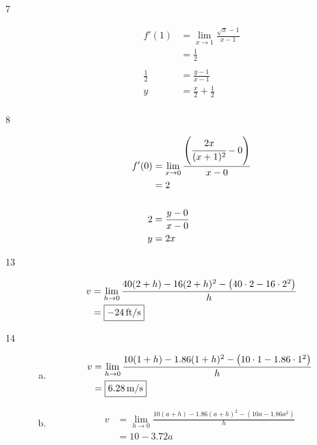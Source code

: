 \documentclass[letterpaper, landscape]{exam}
\begin{document}
\begin{description}
      \item[7]
        \begin{align*}
          f'(1)       & = \lim_{x \to 1} \frac{\sqrt{x} - 1 }{x - 1} \\
                      & = \frac{1}{2} \\
          \\
          \frac{1}{2} & = \frac{y - 1}{x - 1} \\
          y           & = \frac{x}{2} + \frac{1}{2} \\
        \end{align*}

      \item[8]
        \begin{align*}
          f'(0) & = \lim_{x \to 0} \frac{ \left( \cfrac{2x}{(x + 1)^2} - 0 \right) }{x - 0} \\
                & = 2 \\
          \\
          2     & = \frac{y - 0}{x - 0} \\
          y     & = 2x \\
        \end{align*}
      
      \item[13]
        \begin{align*}
          v & = \lim_{h \to 0} \frac{ 40(2 + h) - 16 (2 + h)^2 - \left( 40 \cdot 2 - 16 \cdot 2^2 \right)}{h} \\
            & = \boxed{ \unit[-24]{ft/s} }
        \end{align*}

      \item[14]
        \begin{enumerate}[(a)]
          \item 
            \begin{align*}
              v & = \lim_{h \to 0} \frac{ 10(1 + h) - 1.86 (1 + h)^2 - \left( 10 \cdot 1 - 1.86 \cdot 1^2 \right) }{h} \\
                & = \boxed{ \unit[6.28]{m/s} }
            \end{align*}

          \item
            \begin{align*}
              v & = \lim_{h \to 0} \frac{ 10(a + h) - 1.86 (a + h)^2 - \left( 10 a - 1.86 a^2 \right) }{h} \\
                & = \boxed{ 10 - 3.72a }
            \end{align*}


\end{enumerate}
\end{description}
\end{document}
